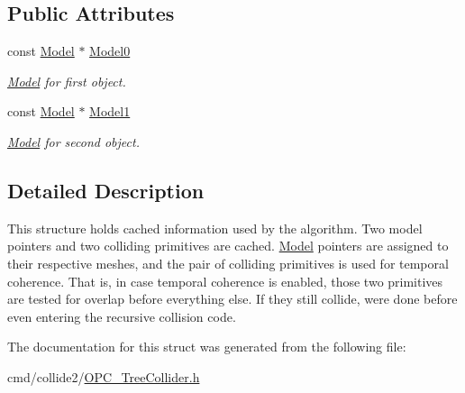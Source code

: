 \subsection*{Public Attributes}
\begin{DoxyCompactItemize}
\item 
const \hyperlink{classModel}{Model} $\ast$ \hyperlink{structBVTCache_a69f8d5a7613435e6c58a6816ecd15e0a}{Model0}\hypertarget{structBVTCache_a69f8d5a7613435e6c58a6816ecd15e0a}{}\label{structBVTCache_a69f8d5a7613435e6c58a6816ecd15e0a}

\begin{DoxyCompactList}\small\item\em \hyperlink{classModel}{Model} for first object. \end{DoxyCompactList}\item 
const \hyperlink{classModel}{Model} $\ast$ \hyperlink{structBVTCache_a092159126dbd147d9488f881e675fea0}{Model1}\hypertarget{structBVTCache_a092159126dbd147d9488f881e675fea0}{}\label{structBVTCache_a092159126dbd147d9488f881e675fea0}

\begin{DoxyCompactList}\small\item\em \hyperlink{classModel}{Model} for second object. \end{DoxyCompactList}\end{DoxyCompactItemize}


\subsection{Detailed Description}
This structure holds cached information used by the algorithm. Two model pointers and two colliding primitives are cached. \hyperlink{classModel}{Model} pointers are assigned to their respective meshes, and the pair of colliding primitives is used for temporal coherence. That is, in case temporal coherence is enabled, those two primitives are tested for overlap before everything else. If they still collide, we\textquotesingle{}re done before even entering the recursive collision code. 

The documentation for this struct was generated from the following file\+:\begin{DoxyCompactItemize}
\item 
cmd/collide2/\hyperlink{OPC__TreeCollider_8h}{O\+P\+C\+\_\+\+Tree\+Collider.\+h}\end{DoxyCompactItemize}
